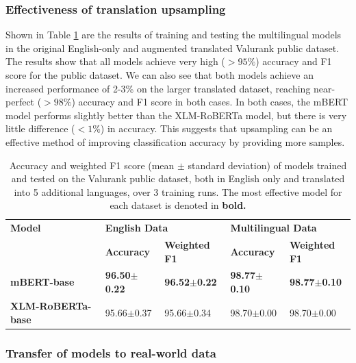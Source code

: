 \documentclass{l4proj}
\begin{document}
\subsubsection{Effectiveness of translation upsampling}  \hfill \par
Shown in Table \ref{table:backtranslation-effectiveness} are the results of training and testing the multilingual models in the original English-only and augmented translated Valurank public dataset. The results show that all models achieve very high ($>95\%$) accuracy and F1 score for the public dataset. We can also see that both models achieve an increased performance of 2-3\% on the larger translated dataset, reaching near-perfect ($>98\%$) accuracy and F1 score in both cases. In both cases, the mBERT model performs slightly better than the XLM-RoBERTa model, but there is very little difference ($<1\%$) in accuracy. This suggests that upsampling can be an effective method of improving classification accuracy by providing more samples.

\begin{table}[]
\begin{tabular}{lllll}
\hline
\textbf{Model}   & \multicolumn{2}{l}{\textbf{English Data}} & \multicolumn{2}{l}{\textbf{Multilingual Data}} \\ \cline{2-5} 
                 & \textbf{Accuracy}    & \textbf{Weighted F1}   & \textbf{Accuracy}   & \textbf{Weighted F1}   \\ \hline 
\textbf{mBERT-base}       & \textbf{96.50$\pm$0.22}    & \textbf{96.52$\pm$0.22}          & \textbf{98.77$\pm$0.10}       & \textbf{98.77$\pm$0.10}          \\
\textbf{XLM-RoBERTa-base} & 95.66$\pm$0.37    & 95.66$\pm$0.34          & 98.70$\pm$0.00       & 98.70$\pm$0.00   
     \\ \hline
\end{tabular}
\caption{Accuracy and weighted F1 score (mean $\pm$ standard deviation) of models trained and tested on the Valurank public dataset, both in English only and translated into 5 additional languages, over 3 training runs. The most effective model for each dataset is denoted in \textbf{bold.}}
\label{table:backtranslation-effectiveness}
\end{table}

\subsubsection{Transfer of models to real-world data}  \hfill \par
\end{document}
